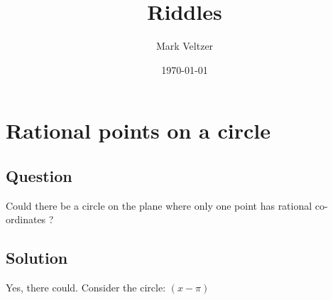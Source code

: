 \documentclass{article}
\title{Riddles}
\author{Mark Veltzer}
\date{\today}
\begin{document}
\maketitle

\section{Rational points on a circle}

\subsection{Question}

Could there be a circle on the plane where only one point has rational co-ordinates ?

\subsection{Solution}

Yes, there could. Consider the circle: $(x-\pi)$

\label{end}
\end{document}
